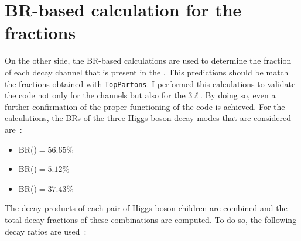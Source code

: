 
 


\section{BR-based calculation for the \tHq fractions}
\label{sec:ChaptH:Sig:truth:Calculations}
 On the other side, the BR-based calculations are used to determine the fraction of each decay channel that is present in the \dileptau. This predictions should be match the fractions obtained with \texttt{TopPartons}. I performed this 
calculations to validate the code
not only for the \dileptau channels but also for the $3\ell$.  By doing so, even a further confirmation
of the proper functioning of the code is achieved. 
For the calculations, the 
BRs of the three Higgs-boson-decay modes that are considered are~\cite{Workman:2022ynf}:
\begin{itemize}
	\item  BR(\Htautau)$= 56.65\%$
	\item  BR(\HWW)$= 5.12\%$ 
	\item  BR(\ZZ)$= 37.43\%$
\end{itemize}
The decay products of each pair of Higgs-boson children are combined and the total decay fractions of %
these combinations are computed. To do so, the following decay ratios are used~\cite{Workman:2022ynf}:

